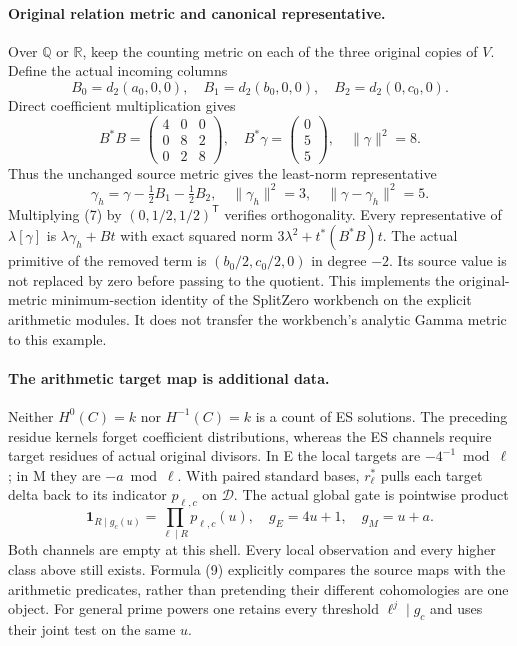 \documentclass[10pt,a4paper]{article}
\begin{document}
\paragraph{Original relation metric and canonical representative.}
Over $\mathbb Q$ or $\mathbb R$, keep the counting metric on each of the
three original copies of $V$. Define the actual incoming columns
\[
 B_0=d_2(a_0,0,0),\quad B_1=d_2(b_0,0,0),\quad B_2=d_2(0,c_0,0).
\]
Direct coefficient multiplication gives
\[
 \boxed{B^*B=\begin{pmatrix}4&0&0\\0&8&2\\0&2&8\end{pmatrix},\quad
 B^*\gamma=\begin{pmatrix}0\\5\\5\end{pmatrix},\quad
 \|\gamma\|^2=8.}                                        \tag{7}
\]
Thus the unchanged source metric gives the least-norm representative
\[
 \boxed{\gamma_h=\gamma-\tfrac12B_1-\tfrac12B_2,
 \quad\|\gamma_h\|^2=3,
 \quad\|\gamma-\gamma_h\|^2=5.}                           \tag{8}
\]
Multiplying (7) by $(0,1/2,1/2)^\mathsf T$ verifies orthogonality.
Every representative of $\lambda[\gamma]$ is $\lambda\gamma_h+Bt$ with
exact squared norm $3\lambda^2+t^*(B^*B)t$. The actual primitive of the
removed term is $(b_0/2,c_0/2,0)$ in degree $-2$. Its source value is not
replaced by zero before passing to the quotient.
This implements the original-metric minimum-section identity of the
SplitZero workbench \cite[AMT7--10]{AMT} on the explicit arithmetic modules.
It does not transfer the workbench's analytic Gamma metric to this example.

\paragraph{The arithmetic target map is additional data.}
Neither $H^0(C)=k$ nor $H^{-1}(C)=k$ is a count of ES solutions.
The preceding residue kernels forget coefficient distributions, whereas
the ES channels require target residues of actual original divisors.
In E the local targets are $-4^{-1}\bmod\ell$; in M they are
$-a\bmod\ell$. With paired standard bases, $r_\ell^*$ pulls each target
delta back to its indicator $p_{\ell,c}$ on $\mathcal D$.
The actual global gate is pointwise product
\[
 \mathbf1_{R\mid g_c(u)}=\prod_{\ell\mid R}p_{\ell,c}(u),
 \quad g_E=4u+1,\quad g_M=u+a.                            \tag{9}
\]
Both channels are empty at this shell. Every local observation and every
higher class above still exists. Formula (9) explicitly compares the source
maps with the arithmetic predicates, rather than pretending their different
cohomologies are one object. For general prime powers one retains every
threshold $\ell^j\mid g_c$ and uses their joint test on the same $u$.
\end{document}
